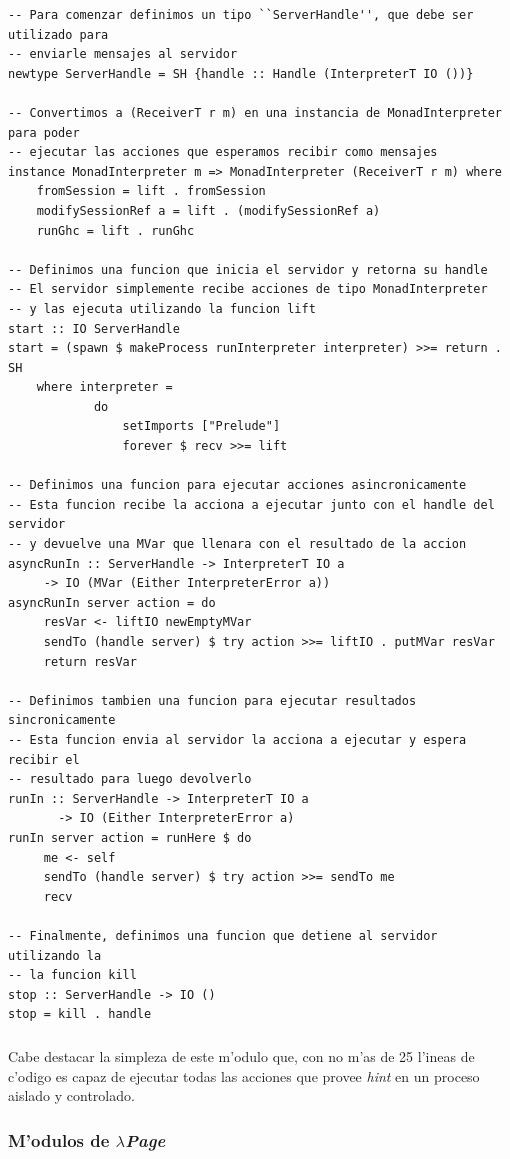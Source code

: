 \documentclass[a4paper]{article}
\newcommand{\hpage}{\textbf{\textsl{$\lambda$Page}}}
\begin{document}
\begin{center}\begin{lstlisting}
-- Para comenzar definimos un tipo ``ServerHandle'', que debe ser utilizado para
-- enviarle mensajes al servidor
newtype ServerHandle = SH {handle :: Handle (InterpreterT IO ())}

-- Convertimos a (ReceiverT r m) en una instancia de MonadInterpreter para poder
-- ejecutar las acciones que esperamos recibir como mensajes
instance MonadInterpreter m => MonadInterpreter (ReceiverT r m) where
    fromSession = lift . fromSession
    modifySessionRef a = lift . (modifySessionRef a)
    runGhc = lift . runGhc 

-- Definimos una funcion que inicia el servidor y retorna su handle
-- El servidor simplemente recibe acciones de tipo MonadInterpreter
-- y las ejecuta utilizando la funcion lift
start :: IO ServerHandle
start = (spawn $ makeProcess runInterpreter interpreter) >>= return . SH
    where interpreter =
            do
                setImports ["Prelude"]
                forever $ recv >>= lift

-- Definimos una funcion para ejecutar acciones asincronicamente
-- Esta funcion recibe la acciona a ejecutar junto con el handle del servidor
-- y devuelve una MVar que llenara con el resultado de la accion
asyncRunIn :: ServerHandle -> InterpreterT IO a
     -> IO (MVar (Either InterpreterError a))
asyncRunIn server action = do
     resVar <- liftIO newEmptyMVar
     sendTo (handle server) $ try action >>= liftIO . putMVar resVar
     return resVar

-- Definimos tambien una funcion para ejecutar resultados sincronicamente
-- Esta funcion envia al servidor la acciona a ejecutar y espera recibir el 
-- resultado para luego devolverlo
runIn :: ServerHandle -> InterpreterT IO a
       -> IO (Either InterpreterError a)
runIn server action = runHere $ do
     me <- self
     sendTo (handle server) $ try action >>= sendTo me
     recv

-- Finalmente, definimos una funcion que detiene al servidor utilizando la
-- la funcion kill
stop :: ServerHandle -> IO ()
stop = kill . handle
\end{lstlisting}\end{center}
\subparagraph{}Cabe destacar la simpleza de este m'odulo que, con no m'as de 25 l'ineas de c'odigo es capaz de ejecutar todas las acciones que provee \textsl{hint} en un proceso aislado y controlado.

\subsubsection{M'odulos de \hpage}
\end{document}
